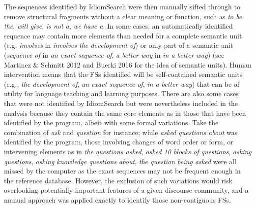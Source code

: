 \documentclass[12pt]{article}
\newenvironment{styleStandard}{\setlength\leftskip{0cm}\setlength\rightskip{0cm plus 1fil}\setlength\parindent{0cm}\setlength\parfillskip{0pt plus 1fil}\setlength\parskip{0cm plus 1pt}\writerlistparindent\writerlistleftskip\leavevmode\normalfont\normalsize\writerlistlabel\ignorespaces}{\unskip\vspace{0cm plus 1pt}\par}
\newcommand\writerlistleftskip{}
\newcommand\writerlistparindent{}
\newcommand\writerlistlabel{}
\begin{document}
\begin{styleStandard}
The sequences identified by IdiomSearch were then manually sifted through to remove structural fragments without a clear meaning or function, such as \textit{to be the}, \textit{will give}, \textit{is not a}, \textit{we have a}. In some cases, an automatically identified sequence may contain more elements than needed for a complete semantic unit (e.g. \textit{involves }in \textit{involves the development of}) or only part of a semantic unit (\textit{sequence of} in \textit{an exact sequence of}, \textit{a better way }in \textit{in a better way}) (see Martinez \& Schmitt 2012 and Buerki 2016 for the idea of semantic units). Human intervention means that the FSs identified will be self-contained semantic units (e.g., \textit{the development of}, \textit{an exact sequence of}, \textit{in a better way}) that can be of utility for language teaching and learning purposes. There are also some cases that were not identified by IdiomSearch but were nevertheless included in the analysis because they contain the same core elements as in those that have been identified by the program, albeit with some formal variations. Take the combination of \textit{ask} and \textit{question} for instance; while \textit{asked questions about} was identified by the program, those involving changes of word order or form, or intervening elements as in \textit{the questions asked}, \textit{asked 10 blocks of questions}, \textit{asking questions}, \textit{asking knowledge questions about}, \textit{the question being asked} were all missed by the computer as the exact sequences may not be frequent enough in the reference database. However, the exclusion of such variations would risk overlooking potentially important features of a given discourse community, and a manual approach was applied exactly to identify those non-contiguous FSs.
\end{styleStandard}
\end{document}
